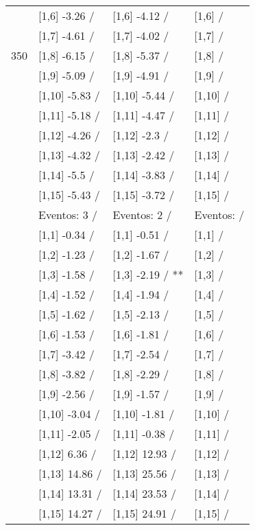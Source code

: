 \begin{table}
\begin{tabular}[t]{llll}
 & {}[1,6] -3.26  / & {}[1,6] -4.12  / & {}[1,6]  /\\
 & {}[1,7] -4.61  / & {}[1,7] -4.02  / & {}[1,7]  /\\
350 & {}[1,8] -6.15  / & {}[1,8] -5.37  / & {}[1,8]  /\\
\addlinespace
 & {}[1,9] -5.09  / & {}[1,9] -4.91  / & {}[1,9]  /\\
 & {}[1,10] -5.83  / & {}[1,10] -5.44  / & {}[1,10]  /\\
 & {}[1,11] -5.18  / & {}[1,11] -4.47  / & {}[1,11]  /\\
 & {}[1,12] -4.26  / & {}[1,12] -2.3  / & {}[1,12]  /\\
 & {}[1,13] -4.32  / & {}[1,13] -2.42  / & {}[1,13]  /\\
\addlinespace
 & {}[1,14] -5.5  / & {}[1,14] -3.83  / & {}[1,14]  /\\
 & {}[1,15] -5.43  / & {}[1,15] -3.72  / & {}[1,15]  /\\
 & Eventos:  3 / & Eventos:  2 / & Eventos:   /\\
 & {}[1,1] -0.34  / & {}[1,1] -0.51  / & {}[1,1]  /\\
 & {}[1,2] -1.23  / & {}[1,2] -1.67  / & {}[1,2]  /\\
\addlinespace
 & {}[1,3] -1.58  / & {}[1,3] -2.19  / ** & {}[1,3]  /\\
 & {}[1,4] -1.52  / & {}[1,4] -1.94  / & {}[1,4]  /\\
 & {}[1,5] -1.62  / & {}[1,5] -2.13  / & {}[1,5]  /\\
 & {}[1,6] -1.53  / & {}[1,6] -1.81  / & {}[1,6]  /\\
 & {}[1,7] -3.42  / & {}[1,7] -2.54  / & {}[1,7]  /\\
\addlinespace
500 & {}[1,8] -3.82  / & {}[1,8] -2.29  / & {}[1,8]  /\\
 & {}[1,9] -2.56  / & {}[1,9] -1.57  / & {}[1,9]  /\\
 & {}[1,10] -3.04  / & {}[1,10] -1.81  / & {}[1,10]  /\\
 & {}[1,11] -2.05  / & {}[1,11] -0.38  / & {}[1,11]  /\\
 & {}[1,12] 6.36  / & {}[1,12] 12.93  / & {}[1,12]  /\\
\addlinespace
 & {}[1,13] 14.86  / & {}[1,13] 25.56  / & {}[1,13]  /\\
 & {}[1,14] 13.31  / & {}[1,14] 23.53  / & {}[1,14]  /\\
 & {}[1,15] 14.27  / & {}[1,15] 24.91  / & {}[1,15]  /\\
\bottomrule
\end{tabular}
\end{table}
